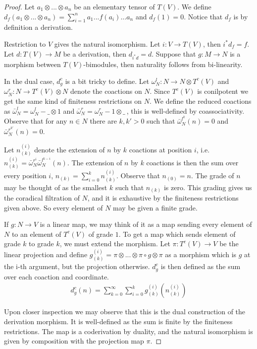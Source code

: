 \documentclass[../thesis.tex]{subfiles}
\begin{document}
            \begin{proof}
                Let $a_1\otimes ... \otimes a_n$ be an elementary tensor of $T(V)$. We define $d_f(a_1\otimes ... \otimes a_n) = \sum_{i=1}^n a_1...f(a_i)...a_n$ and $d_f(1) = 0$. Notice that $d_f$ is by definition a derivation.
                
                Restriction to $V$ gives the natural isomorphism. Let $i : V\rightarrow T(V)$, then $i^*d_f = f$. Let $d : T(V) \rightarrow M$ be a derivation, then $d_{i^*d}=d$. Suppose that $g: M \rightarrow N$ is a morphism between $T(V)$-bimodules, then naturality follows from bi-linearity.

                In the dual case, $d_g^c$ is a bit tricky to define. Let $\omega^l_N:N\rightarrow N\otimes T^c(V)$ and $\omega^r_N : N\rightarrow T^c(V) \otimes N$ denote the coactions on $N$. Since $T^c(V)$ is conilpotent we get the same kind of finiteness restrictions on $N$. We define the reduced coactions as $\bar{\omega}^l_N = \omega^l_N - \_\otimes 1$ and $\bar{\omega}^r_N = \omega^r_N - 1\otimes\_\ $, this is well-defined by coassociativity. Observe that for any $n\in N$ there are $k, k'>0$ such that ${\bar{\omega}^{l^k}_N}(n) = 0$ and ${\bar{\omega}^{r^{k'}}_N}(n)=0$.

                Let $n_{(k)}^{(i)}$ denote the extension of $n$ by $k$ coactions at position $i$, i.e. $n_{(k)}^{(i)} = \bar{\omega}^{r^i}_N\bar{\omega}^{l^{k-i}}_N(n)$. The extension of $n$ by $k$ coactions is then the sum over every position $i$, $n_{(k)} = \sum_{i=0}^kn_{(k)}^{(i)}$. Observe that $n_{(0)} = n$. The grade of $n$ may be thought of as the smallest $k$ such that $n_{(k)}$ is zero. This grading gives us the coradical filtration of $N$, and it is exhaustive by the finiteness restrictions given above. So every element of $N$ may be given a finite grade.

                If $g: N \rightarrow V$ is a linear map, we may think of it as a map sending every element of $N$ to an element of $T^c(V)$ of grade $1$. To get a map which sends element of grade $k$ to grade $k$, we must extend the morphism. Let $\pi : T^c(V) \rightarrow V$ be the linear projection and define $g_{(k)}^{(i)} = \pi\otimes ... \otimes \pi \circ g \otimes \pi$ as a morphism which is $g$ at the i-th argument, but the projection otherwise. $d_g^c$ is then defined as the sum over each coaction and coordinate.
                \begin{align*}
                    d_g^c(n) = \sum_{k=0}^\infty \sum_{i=0}^k g_{(k)}^{(i)}(n_{(k)}^{(i)})
                \end{align*}
                
                Upon closer inspection we may observe that this is the dual construction of the derivation morphism. It is well-defined as the sum is finite by the finiteness restrictions. The map is a coderivation by duality, and the natural isomorphism is given by composition with the projection map $\pi$.
            \end{proof}
\end{document}
